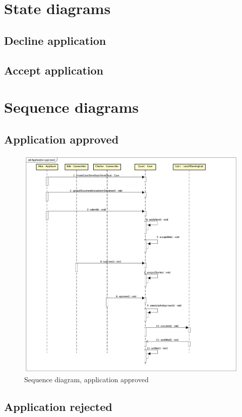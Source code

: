 \newpage
\section{State diagrams}

\subsection{Decline application}

\subsection{Accept application}

\section{Sequence diagrams}

\subsection{Application approved}

\begin{figure}[htb!]
    \centering
    \includegraphics[width=\textwidth]{img/sd-application-approved.png}
    \caption{Sequence diagram, application approved}
    \label{fig:my_label}
\end{figure}


\subsection{Application rejected}